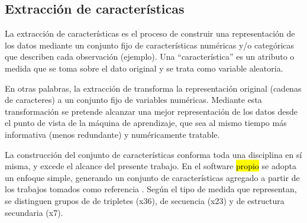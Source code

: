 %
%
\subsection{Extracción de características}
%
La extracción de características es el proceso de construir una
representación de los datos mediante un conjunto fijo de
características numéricas y/o categóricas que describen cada
observación (ejemplo).  Una ``característica'' es un atributo o medida
que se toma sobre el dato original y se trata como variable aleatoria.

En otras palabras, la extracción de  transforma la
representación original (cadenas de caracteres) a un conjunto fijo de
variables numéricas.  Mediante esta transformación se pretende
alcanzar una mejor representación de los datos desde el punto de vista
de la máquina de aprendizaje, que sea al mismo tiempo más informativa
(menos redundante) y numéricamente tratable.

La construcción del conjunto de características conforma toda una
disciplina en sí misma, y excede el alcance del presente trabajo.  En
el software \hl{propio} se adopta un enfoque simple, generando un
conjunto de características agregado a partir de los trabajos tomados
como referencia \cite{xue,ng,batuwita}.  Según el tipo de medida que
representan, se distinguen grupos de  de tripletes (x36), de
secuencia (x23) y de estructura secundaria (x7).

